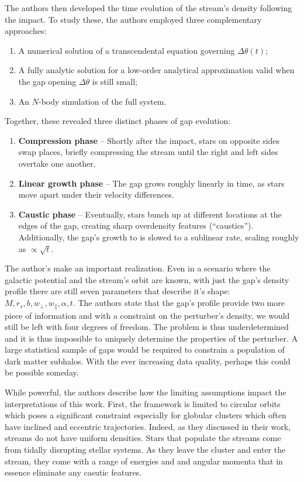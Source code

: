             The authors then developed the time evolution of the stream's density following the impact. To study these, the authors employed three complementary approaches:
            \begin{enumerate}
                \item A numerical solution of a transcendental equation governing $\Delta \theta(t)$;
                \item A fully analytic solution for a low-order analytical approximation valid when the gap opening $\Delta \theta$ is still small;
                \item An $N$-body simulation of the full system.
            \end{enumerate}

            Together, these revealed three distinct phases of gap evolution:
            \begin{enumerate}
                \item \textbf{Compression phase} --  Shortly after the impact, stars on opposite sides swap places, briefly compressing the stream until the right and left sides overtake one another. 
                \item \textbf{Linear growth phase} -- The gap grows roughly linearly in time, as stars move apart under their velocity differences.
                \item \textbf{Caustic phase} -- Eventually, stars bunch up at different locations at the edges of the gap, creating sharp overdensity features (``caustics''). Additionally, the gap's growth to is slowed to a sublinear rate, scaling roughly as $\propto \sqrt{t}$.
            \end{enumerate}


            The author's make an important realization. Even in a scenario where the galactic potential and the stream's orbit are known, with just the gap's density profile there are still seven parameters that describe it's shape: $M,r_s,b,w_\perp,w_\parallel,\alpha,t$. The authors state that the gap's profile provide two more piece of information and with a constraint on the perturber's density, we would still be left with four degrees of freedom. The problem is thus underdetermined and it is thus impossible to uniquely determine the properties of the perturber. A large statistical sample of gaps would be required to constrain a population of dark matter subhalos. With the ever increasing data quality, perhaps this could be possible someday.  

            While powerful, the authors describe how the limiting assumptions impact the interpretations of this work. First, the framework is limited to circular orbits which poses a significant constraint especially for globular clusters which often have inclined and eccentric trajectories. Indeed, as they discussed in their work, streams do not have uniform densities. Stars that populate the streams come from tidally disrupting stellar systems. As they leave the cluster and enter the stream, they come with a range of energies and and angular momenta that in essence eliminate any casutic features. 

